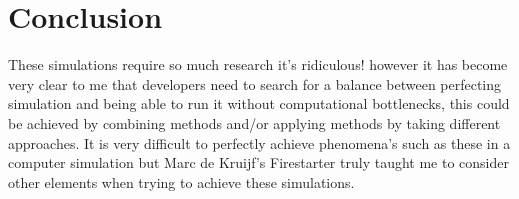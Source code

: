 \documentclass[article, 10pt]{article}
\begin{document}
\section{Conclusion}
These simulations require so much research it's ridiculous! however it has become very clear to me that developers need to search for a balance between perfecting simulation and being able to run it without computational bottlenecks, this could be achieved by combining methods and/or applying methods by taking different approaches. It is very difficult to perfectly achieve phenomena's such as these in a computer simulation but Marc de Kruijf's Firestarter\cite{dekruijf} truly taught me to consider other elements when trying to achieve these simulations.



\end{document}
